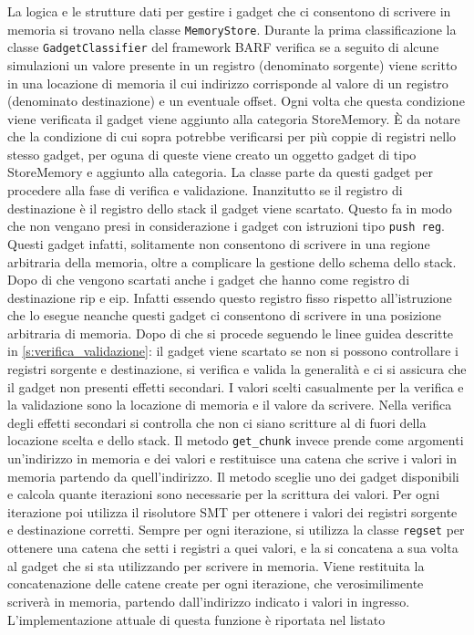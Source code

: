 La logica e le strutture dati per gestire i gadget che ci consentono
di scrivere in memoria si trovano nella classe
\lstinline{MemoryStore}.  Durante la prima classificazione la classe
\lstinline{GadgetClassifier} del framework BARF verifica se a seguito
di alcune simulazioni un valore presente in un registro (denominato
sorgente) viene scritto in una locazione di memoria il cui indirizzo
corrisponde al valore di un registro (denominato destinazione) e un
eventuale offset. Ogni volta che questa condizione viene verificata il
gadget viene aggiunto alla categoria StoreMemory. È da notare che la
condizione di cui sopra potrebbe verificarsi per più coppie di
registri nello stesso gadget, per oguna di queste viene creato un
oggetto gadget di tipo StoreMemory e aggiunto alla categoria. La
classe parte da questi gadget per procedere alla fase di verifica e
validazione. Inanzitutto se il registro di destinazione è il registro
dello stack il gadget viene scartato. Questo fa in modo che non
vengano presi in considerazione i gadget con istruzioni tipo
\lstinline{push reg}. Questi gadget infatti, solitamente non
consentono di scrivere in una regione arbitraria della memoria, oltre
a complicare la gestione dello schema dello stack. Dopo di che vengono
scartati anche i gadget che hanno come registro di destinazione rip e
eip. Infatti essendo questo registro fisso rispetto all'istruzione che
lo esegue neanche questi gadget ci consentono di scrivere in una
posizione arbitraria di memoria. Dopo di che si procede seguendo le
linee guidea descritte in \ref{s:verifica_validazione}: il gadget
viene scartato se non si possono controllare i registri sorgente e
destinazione, si verifica e valida la generalità e ci si assicura che
il gadget non presenti effetti secondari. I valori scelti casualmente
per la verifica e la validazione sono la locazione di memoria e il
valore da scrivere. Nella verifica degli effetti secondari si
controlla che non ci siano scritture al di fuori della locazione
scelta e dello stack. Il metodo \lstinline{get_chunk} invece prende
come argomenti un'indirizzo in memoria e dei valori e restituisce una
catena che scrive i valori in memoria partendo da quell'indirizzo. Il
metodo sceglie uno dei gadget disponibili e calcola quante iterazioni
sono necessarie per la scrittura dei valori. Per ogni iterazione poi
utilizza il risolutore SMT per ottenere i valori dei registri sorgente
e destinazione corretti. Sempre per ogni iterazione, si utilizza la
classe \lstinline{regset} per ottenere una catena che setti i registri
a quei valori, e la si concatena a sua volta al gadget che si sta
utilizzando per scrivere in memoria. Viene restituita la
concatenazione delle catene create per ogni iterazione, che
verosimilimente scriverà in memoria, partendo dall'indirizzo indicato
i valori in ingresso. L'implementazione attuale di questa funzione è
riportata nel listato 

